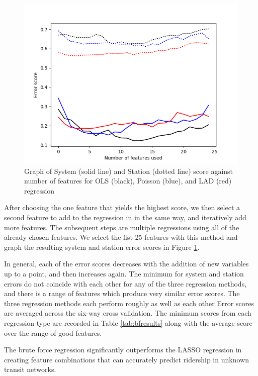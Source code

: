 \documentclass[11pt]{article}
\begin{document}
\begin{figure}
\centering
\includegraphics[width=\linewidth]{bfregress}
\vspace{-10pt}
\caption{Graph of System (solid line) and Station (dotted line) score against number of features for OLS (black), Poisson (blue), and LAD (red) regression}\label{fig:bfscores}
\end{figure}



After choosing the one feature that yields the highest score, we then select a second feature to add to the regression in in the same way, and iteratively add more features. The subsequent steps are multiple regressions using all of the already chosen features. We select the fist 25 features with this method and graph the resulting system and station error scores in Figure \ref{fig:bfscores}. 

In general, each of the error scores decreases with the addition of new variables up to a point, and then increases again. The minimum for system and station errors do not coincide with each other for any of the three regression methods, and there is a range of features which produce very similar error scores. The three regression methods each perform roughly as well as each other Error scores are averaged across the six-way cross validation. The minimum scores from each regression type are recorded in Table \ref{tab:bfresults} along with the average score over the range of good features.

The brute force regression significantly outperforms the LASSO regression in creating feature combinations that can accurately predict ridership in unknown transit networks.
\end{document}
